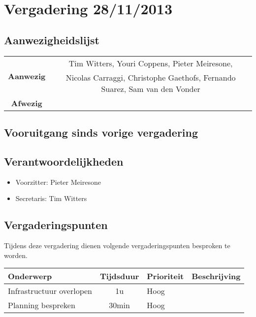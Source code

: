 \section{Vergadering 28/11/2013}
\subsection{Aanwezigheidslijst}
\begin{table}[htbp]
	\centering
	\begin{tabular}{c|c}
		\multirow{2}{*}{\textbf{Aanwezig}} & Tim Witters, Youri Coppens, Pieter Meiresone, \\
		& Nicolas Carraggi,  Christophe Gaethofs, Fernando Suarez, Sam van den Vonder \\
		\hline
		\textbf{Afwezig} & \\
	\end{tabular}
\end{table}

\subsection{Vooruitgang sinds vorige vergadering}


\subsection{Verantwoordelijkheden}
\begin{itemize}
	\item Voorzitter: Pieter Meiresone
	\item Secretaris: Tim Witters
\end{itemize}
\subsection{Vergaderingspunten}

Tijdens deze vergadering dienen volgende vergaderingspunten besproken te worden.
\begin{table} [H]
	\centering
	\begin{tabular} {l|cll}
		\textbf{Onderwerp} & \textbf{Tijdsduur} & \textbf{Prioriteit} & \textbf{Beschrijving} \\ %
		\hline
		Infrastructuur overlopen & 1u & Hoog & \\
		Planning bespreken & 30min & Hoog & \\
	\end{tabular}
\end{table}
